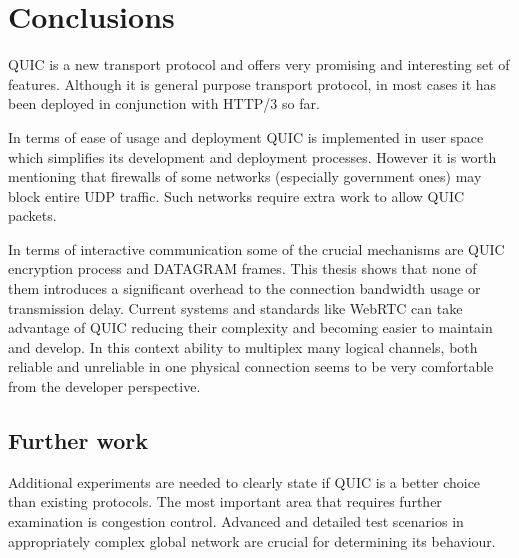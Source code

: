\section{Conclusions}
\label{sec:conclusions}
QUIC is a new transport protocol and offers very promising and interesting set of features.
Although it is general purpose transport protocol, in most cases it has been deployed in conjunction with HTTP/3 so far.

In terms of ease of usage and deployment QUIC is implemented in user space which simplifies its development and
deployment processes.
However it is worth mentioning that firewalls of some networks (especially government ones) may block entire UDP traffic.
Such networks require extra work to allow QUIC packets.

In terms of interactive communication some of the crucial mechanisms are QUIC encryption process and DATAGRAM frames.
This thesis shows that none of them introduces a significant overhead to the connection bandwidth usage or transmission delay.
Current systems and standards like WebRTC can take advantage of QUIC reducing their complexity and becoming easier to maintain and develop.
In this context ability to multiplex many logical channels, both reliable and unreliable in one physical connection seems to be
very comfortable from the developer perspective.

\subsection{Further work}
\label{subsec:further-work}
Additional experiments are needed to clearly state if QUIC is a better choice than existing protocols.
The most important area that requires further examination is congestion control.
Advanced and detailed test scenarios in appropriately complex global network are crucial for determining its behaviour.
